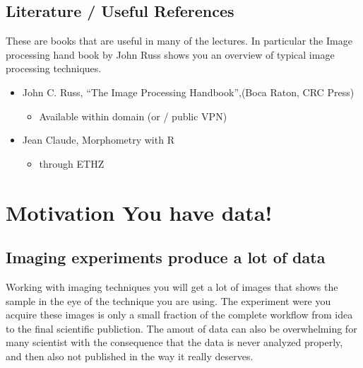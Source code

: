 \documentclass[letterpaper,10pt,english]{sphinxmanual}
\begin{document}
\section{Literature / Useful References}
\label{\detokenize{01-Introduction:literature-useful-references}}
\sphinxAtStartPar
These are books that are useful in many of the lectures. In particular the Image processing hand book by John Russ shows you an overview of typical image processing techniques.
\begin{itemize}
\item {} 
\sphinxAtStartPar
John C. Russ, “The Image Processing Handbook”,(Boca Raton, CRC Press)
\begin{itemize}
\item {} 
\sphinxAtStartPar
Available  within domain  (or  / public VPN)

\end{itemize}

\item {} 
\sphinxAtStartPar
Jean Claude, Morphometry with R
\begin{itemize}
\item {} 
\sphinxAtStartPar
{} through ETHZ

\end{itemize}

\end{itemize}


\chapter{Motivation \sphinxhyphen{} You have data!}
\label{\detokenize{01-Introduction:motivation-you-have-data}}

\section{Imaging experiments produce a lot of data}
\label{\detokenize{01-Introduction:imaging-experiments-produce-a-lot-of-data}}
\sphinxAtStartPar
Working with imaging techniques you will get a lot of images that shows the sample in the eye of the technique you are using. The experiment were you acquire these images is only a small fraction of the complete workflow from idea to the final scientific publiction. The amout of data can also be overwhelming for many scientist with the consequence that the data is never analyzed properly, and then also not published in the way it really deserves.
\end{document}
